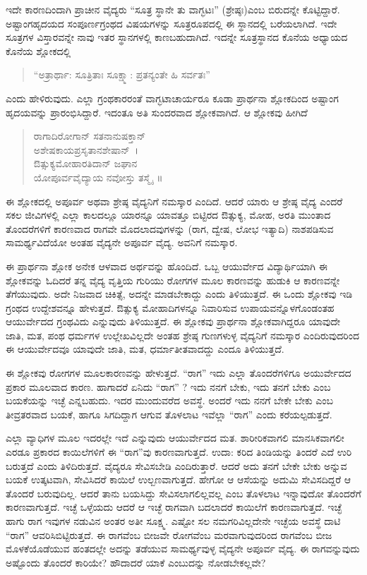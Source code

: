 {ಇದೇ ಕಾರಣದಿಂದಾಗಿ ಪ್ರಾಚೀನ ವೈದ್ಯರು “ಸೂತ್ರ ಸ್ಥಾನೇ ತು ವಾಗ್ಭಟಃ” \enginline{-} (ಶ್ರೇಷ್ಠಃ)ಎಂಬ ಬಿರುದನ್ನೇ ಕೊಟ್ಟಿದ್ದಾರೆ. ಅಷ್ಟಾಂಗಹೃದಯದ ಸಂಪೂರ್ಣಗ್ರಂಥದ ವಿಷಯಗಳನ್ನು ಸೂತ್ರರೂಪದಲ್ಲಿ ಈ ಸ್ಥಾನದಲ್ಲಿ ಬರೆಯಲಾಗಿದೆ. ಇದೇ ಸೂತ್ರಗಳ ವಿಸ್ತಾರವನ್ನೇ ನಾವು ಇತರ ಸ್ಥಾನಗಳಲ್ಲಿ ಕಾಣಬಹುದಾಗಿದೆ. ಇದನ್ನೇ ಸೂತ್ರಸ್ಥಾನದ ಕೊನೆಯ ಅಧ್ಯಾಯದ ಕೊನೆಯ ಶ್ಲೋಕದಲ್ಲಿ 
\begin{verse}
“ಅತ್ರಾರ್ಥಾ: ಸೂತ್ರಿತಾಃ ಸೂಕ್ಷ್ಮಾ: ಪ್ರತನ್ಯಂತೇ ಹಿ ಸರ್ವತಃ” 
\end{verse}
ಎಂದು ಹೇಳಿರುವುದು. ಎಲ್ಲಾ ಗ್ರಂಥಕಾರರಂತೆ ವಾಗ್ಭಟಾಚಾರ್ಯರೂ ಕೂಡಾ ಪ್ರಾರ್ಥನಾ ಶ್ಲೋಕದಿಂದ ಅಷ್ಟಾಂಗ ಹೃದಯವನ್ನು ಪ್ರಾರಂಭಿಸಿದ್ದಾರೆ. ಇದಂತೂ ಅತಿ ಸುಂದರವಾದ ಶ್ಲೋಕವಾಗಿದೆ. ಆ ಶ್ಲೋಕವು ಹೀಗಿದೆ \
\begin{verse}
ರಾಗಾದಿರೋಗಾನ್ ಸತನಾನುಷಕ್ತಾನ್\\
ಅಶೇಷಕಾಯಪ್ರಸೃತಾನಶೇಷಾನ್~। \\
ಔತ್ಸುಕ್ಯಮೋಹಾರತಿದಾನ್‍ ಜಘಾನ\\
ಯೋಪೂರ್ವವೈದ್ಯಾಯ ನವೋಸ್ತು ತಸ್ಮೈ~॥
\end{verse}
ಈ ಶ್ಲೋಕದಲ್ಲಿ ಅಪೂರ್ವ ಅಥವಾ ಶ್ರೇಷ್ಠ ವೈದ್ಯನಿಗೆ ನಮಸ್ಕಾರ ಎಂದಿದೆ. ಆದರೆ ಯಾರು ಆ ಶ್ರೇಷ್ಠ ವೈದ್ಯ ಎಂದರೆ ಸಕಲ ಜೀವಿಗಳಲ್ಲಿ ಎಲ್ಲಾ ಕಾಲದಲ್ಲೂ ಯಾರನ್ನೂ ಯಾವತ್ತೂ ಬಿಟ್ಟಿರದ ಔತ್ಸುಕ್ಯ, ಮೋಹ, ಅರತಿ ಮುಂತಾದ ತೊಂದರೆಗಳಿಗೆ ಕಾರಣವಾದ ರಾಗವೇ ಮೊದಲಾದವುಗಳನ್ನು (ರಾಗ, ದ್ವೇಷ, ಲೋಭ ಇತ್ಯಾದಿ) ನಾಶಪಡಿಸುವ ಸಾಮರ್ಥ್ಯವಿದೆಯೋ ಅಂತಹ ವೈದ್ಯನೇ ಅಪೂರ್ವ ವೈದ್ಯ. ಅವನಿಗೆ ನಮಸ್ಕಾರ.

ಈ ಪ್ರಾರ್ಥನಾ ಶ್ಲೋಕ ಅನೇಕ ಆಳವಾದ ಅರ್ಥವನ್ನು ಹೊಂದಿದೆ. ಒಬ್ಬ ಆಯುರ್ವೇದ ವಿದ್ಯಾರ್ಥಿಯಾಗಿ  ಈ ಶ್ಲೋಕವನ್ನು ಓದಿದರೆ ತನ್ನ ವೈದ್ಯ ವೃತ್ತಿಯ ಗುರಿಯು ರೋಗಗಳ ಮೂಲ ಕಾರಣವನ್ನು ಹುಡುಕಿ ಆ ಕಾರಣವನ್ನೇ ತೆಗೆಯುವುದು. ಅದೇ ನಿಜವಾದ ಚಿಕಿತ್ಸೆ, ಅದನ್ನೇ ಮಾಡಬೇಕಾದ್ದು ಎಂದು ತಿಳಿಯುತ್ತದೆ. ಈ ಒಂದು ಶ್ಲೋಕವು ಇಡಿ ಗ್ರಂಥದ ಉದ್ದೇಶವನ್ನೂ ಹೇಳುತ್ತದೆ. ಔತ್ಸುಕ್ಯ ಮೋಹಾದಿಗಳನ್ನೂ ನಿವಾರಿಸುವ ಉಪಾಯವನ್ನೊಳಗೊಂಡಂತಹ ಆಯುರ್ವೇದದ ಗ್ರಂಥವಿದು ಎನ್ನುವುದು ತಿಳಿಯುತ್ತದೆ. ಈ ಶ್ಲೋಕವು ಪ್ರಾರ್ಥನಾ ಶ್ಲೋಕವಾಗಿದ್ದರೂ ಯಾವುದೇ ಜಾತಿ, ಮತ, ಪಂಥ ಧರ್ಮಗಳ ಉಲ್ಲೇಖವಿಲ್ಲದೇ ಅಂತಹ ಶ್ರೇಷ್ಠ ಗುಣಗಳುಳ್ಳ ವೈದ್ಯನಿಗೆ ನಮಸ್ಕಾರ ಎಂದಿರುವುದರಿಂದ ಈ ಆಯುರ್ವೇದವೂ ಯಾವುದೇ ಜಾತಿ, ಮತ, ಧರ್ಮಾತೀತವಾದದ್ದು ಎಂದೂ ತಿಳಿಯುತ್ತದೆ.

ಈ ಶ್ಲೋಕವು ರೋಗಗಳ ಮೂಲಕಾರಣವನ್ನು ಹೇಳುತ್ತದೆ. “ರಾಗ” ಇದು ಎಲ್ಲಾ ತೊಂದರೆಗಳಿಗೂ ಅಯುರ್ವೇದದ ಪ್ರಕಾರ ಮೂಲವಾದ ಕಾರಣ. ಹಾಗಾದರೆ ಏನಿದು “ರಾಗ” ? ಇದು ನನಗೆ ಬೇಕು, ಇದು ತನಗೆ ಬೇಕು ಎಂಬ ಬಯಕೆಯನ್ನು ಇಚ್ಛೆ ಎನ್ನಬಹುದು. ಇದರ ಮುಂದುವರೆದ ಅವಸ್ಥೆ. ಅಂದರೆ ಇದು ನನಗೆ ಬೇಕೇ ಬೇಕು ಎಂಬ ತೀವ್ರತರವಾದ ಬಯಕೆ, ಹಾಗೂ ಸಿಗದಿದ್ದಾಗ ಆಗುವ ತೊಳಲಾಟ ಇವೆಲ್ಲಾ “ರಾಗ” ಎಂದು ಕರೆಯಲ್ಪಡುತ್ತದೆ.

ಎಲ್ಲಾ ವ್ಯಾಧಿಗಳ ಮೂಲ ಇದರಲ್ಲೇ ಇದೆ ಎನ್ನುವುದು ಆಯುರ್ವೇದದ ಮತ. ಶಾರೀರಿಕವಾಗಲಿ ಮಾನಸಿಕವಾಗಲೀ ಎರಡೂ ಪ್ರಕಾರದ ಕಾಯಿಲೆಗಳಿಗೆ ಈ “ರಾಗ”ವು ಕಾರಣವಾಗುತ್ತದೆ. ಉದಾ: ಕರಿದ ತಿಂಡಿಯನ್ನು ತಿಂದರೆ ಎದೆ ಉರಿ ಬರುತ್ತದೆ ಎಂದು ತಿಳಿದಿರುತ್ತದೆ. ವೈದ್ಯರೂ ಸೇವಿಸಬೇಡಿ ಎಂದಿರುತ್ತಾರೆ. ಆದರೆ ಅದು ತನಗೆ ಬೇಕೇ ಬೇಕು ಅನ್ನುವ ಬಯಕೆ ಉತ್ಕಟವಾಗಿ, ಸೇವಿಸಿದರೆ ಕಾಯಿಲೆ ಉಲ್ಬಣವಾಗುತ್ತದೆ. ಹೇಗೋ ಆ ಆಸೆಯನ್ನು ಅದುಮಿ ಸೇವಿಸದಿದ್ದರೆ ಆ ತೊಂದರೆ ಬರುವುದಿಲ್ಲ. ಆದರೆ ತಾನು ಬಯಸಿದ್ದು ಸೇವಿಸಲಾಗಲಿಲ್ಲವಲ್ಲ ಎಂಬ ತೊಳಲಾಟ ಇನ್ನಾವುದೋ ತೊಂದರೆಗೆ  ಕಾರಣ\-ವಾಗುತ್ತದೆ. ಇಚ್ಛೆ ಒಳ್ಳೆಯದು ಆದರೆ ಆ ಇಚ್ಛೆ ರಾಗವಾಗಿ ಬದಲಾದರೆ ಕಾಯಿಲೆಗೆ ಕಾರಣ\-ವಾಗುತ್ತದೆ. ಇಚ್ಛೆ ಹಾಗು ರಾಗ ಇವುಗಳ ನಡುವಿನ ಅಂತರ ಅತೀ ಸೂಕ್ಷ್ಮ. ಎಷ್ಟೋ ಸಲ ನಮಗರಿವಿಲ್ಲದೇನೇ ಇಚ್ಛೆಯ ಅವಸ್ಥೆ ದಾಟಿ “ರಾಗ” ಆವರಿಸಿಬಿಟ್ಟಿರುತ್ತದೆ. ಈ ರಾಗವೆಂಬ ಬೀಜವೇ ರೋಗವೆಂಬ ಮರವಾಗುವುದರಿಂದ ರಾಗವೆಂಬ ಬೀಜ ಮೊಳಕೆಯೊಡೆಯುವ ಹಂತದಲ್ಲೇ ಅದನ್ನು ತಡೆಯುವ ಸಾಮರ್ಥ್ಯವುಳ್ಳ ವೈದ್ಯನೇ ಅಪೂರ್ವ ವೈದ್ಯ. ಈ ರಾಗವನ್ನುವುದು ಅಷ್ಟೊಂದು ತೊಂದರೆ ಕಾರಿಯೇ? ಹೌದಾದರೆ ಯಾಕೆ ಎಂಬುದನ್ನು ನೋಡಬೇಕಲ್ಲವೇ?

}
